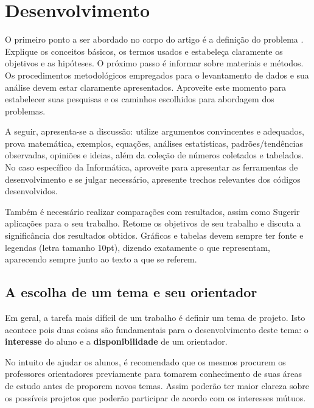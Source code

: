 \documentclass[a4paper,12pt]{article}
\begin{document}
\section{Desenvolvimento}

O primeiro ponto a ser abordado no corpo do artigo é a definição do problema \cite{zeroum}. Explique os conceitos básicos, os termos usados e estabeleça claramente os objetivos e as hipóteses. O próximo passo é informar sobre materiais e métodos. Os procedimentos metodológicos empregados para o levantamento de dados e sua análise devem estar claramente apresentados. Aproveite este momento para estabelecer suas pesquisas e os caminhos escolhidos para abordagem dos problemas.

A seguir, apresenta-se a discussão: utilize argumentos convincentes e adequados, prova matemática, exemplos, equações, análises estatísticas, padrões/tendências observadas, opiniões e ideias, além da coleção de números coletados e tabelados. No caso específico da Informática, aproveite para apresentar as ferramentas de desenvolvimento e se julgar necessário, apresente trechos relevantes dos códigos desenvolvidos.

Também é necessário realizar comparações com resultados, assim como Sugerir aplicações para o seu trabalho. Retome os objetivos de seu trabalho e discuta a significância dos resultados obtidos.
Gráficos e tabelas devem sempre ter fonte e legendas (letra tamanho 10pt), dizendo exatamente o que representam, aparecendo sempre junto ao texto a que se
referem.

\subsection{A escolha de um tema e seu orientador}

Em geral, a tarefa mais difícil de um trabalho é definir um tema de projeto. Isto acontece pois duas coisas são fundamentais para o desenvolvimento deste tema: o \textbf{interesse} do aluno e a \textbf{disponibilidade} de um orientador.

No intuito de ajudar os alunos, é recomendado que os mesmos procurem os professores orientadores previamente para tomarem conhecimento de suas áreas de estudo antes de proporem novos temas. Assim poderão ter maior clareza sobre os possíveis projetos que poderão participar de acordo com os interesses mútuos.
\end{document}
